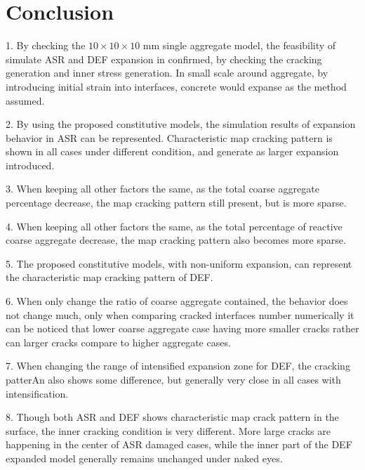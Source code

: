 \clearpage
\section{Conclusion}

1. By checking the $10 \times 10 \times 10$ mm single aggregate model, the feasibility of simulate ASR and DEF expansion in confirmed, by checking the cracking generation and inner stress generation. In small scale around aggregate, by introducing initial strain into interfaces, concrete would expanse as the method assumed.

2. By using the proposed constitutive models, the simulation results of expansion behavior in ASR can be represented. Characteristic map cracking pattern is shown in all cases under different condition, and generate as larger expansion introduced.

3. When keeping all other factors the same, as the total coarse aggregate percentage decrease, the map cracking pattern still present, but is more sparse.

4. When keeping all other factors the same, as the total percentage of reactive coarse aggregate decrease, the map cracking pattern also becomes more sparse.

5. The proposed constitutive models, with non-uniform expansion, can represent the characteristic map cracking pattern of DEF.

6. When only change the ratio of coarse aggregate contained, the behavior does not change much, only when comparing cracked interfaces number numerically it can be noticed that lower coarse aggregate case having more smaller cracks rather can larger cracks compare to higher aggregate cases.

7. When changing the range of intensified expansion zone for DEF, the cracking patterAn also shows some difference, but generally very close in all cases with intensification.

8. Though both ASR and DEF shows characteristic map crack pattern in the surface, the inner cracking condition is very different. More large cracks are happening in the center of ASR damaged cases, while the inner part of the DEF expanded model generally remains unchanged under naked eyes.
 
